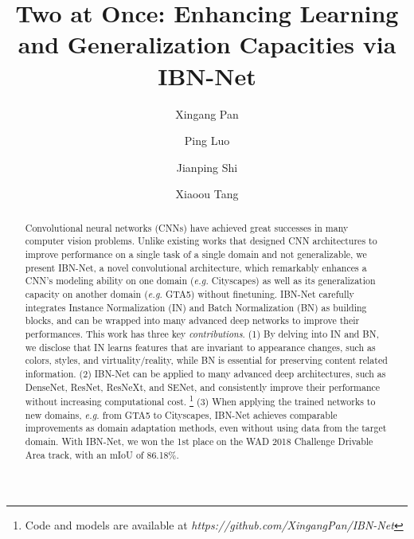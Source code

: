 \documentclass[runningheads]{llncs}
\newcommand{\eg} {\emph{e.g. }}
\begin{document}
\title{Two at Once: Enhancing Learning and Generalization Capacities via IBN-Net
} 

\author{Xingang Pan \and
Ping Luo \and
Jianping Shi \and
Xiaoou Tang}


\maketitle              \setcounter{footnote}{0}
\begin{abstract}
Convolutional neural networks (CNNs) have achieved great successes in many computer vision problems.
Unlike existing works that designed CNN architectures to improve performance on a single task of a single domain and not generalizable, 
we present IBN-Net, a novel convolutional architecture, which remarkably enhances a CNN's modeling ability on one domain (\eg Cityscapes) as well as its generalization capacity on another domain (\eg GTA5) without finetuning. IBN-Net carefully integrates Instance Normalization (IN) and Batch Normalization (BN) as building blocks, and
can be wrapped into many advanced deep networks to improve their performances.
This work has three key \emph{contributions}.
(1) By delving into IN and BN, we disclose that IN learns features that are invariant to appearance changes, such as colors, styles, and virtuality/reality, 
while BN is essential for preserving content related information.
(2) IBN-Net can be applied to many advanced deep architectures, such as DenseNet, ResNet, ResNeXt, and SENet, and consistently improve their performance without increasing computational cost.
\footnote{Code and models are available at \textit{https://github.com/XingangPan/IBN-Net}}
(3)
When applying the trained networks to new domains, \eg from GTA5 to Cityscapes,
IBN-Net achieves comparable improvements as domain adaptation methods, even without using data from the target domain.
With IBN-Net, we won the 1st place on the WAD 2018 Challenge Drivable Area track, with an mIoU of 86.18\%.


\end{abstract}
\end{document}
